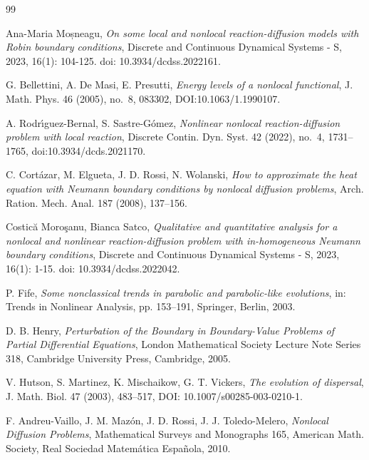 \documentclass[a4paper,12pt]{amsart}
\begin{document}
\begin{thebibliography}{99}

 {Ana-Maria Moșneagu, \emph{On some local and nonlocal reaction-diffusion models with Robin boundary conditions}, Discrete and Continuous Dynamical Systems - S, 2023, 16(1): 104-125. doi: 10.3934/dcdss.2022161.}

 G. {Bellettini}, A. De Masi, E. Presutti, \emph{Energy levels of a nonlocal functional}, {J. Math. Phys. 46 (2005), no.~8, 083302}, DOI:10.1063/1.1990107.

 A. {Rodr\'{\i}guez-Bernal}, S. {Sastre-G\'omez},  \emph{Nonlinear {nonlocal reaction-diffusion problem with local reaction}}, Discrete {Contin.} Dyn. Syst. {42} {(2022)}, no.~4, 1731--1765,
doi:10.3934/dcds.2021170.

 {C. Cort\'azar, M. Elgueta, J. D. Rossi, N. Wolanski, \emph{How to approximate the heat equation with Neumann boundary conditions by nonlocal diffusion problems}, Arch. Ration. Mech. Anal. 187 (2008), 137--156.}

 {Costică Moroşanu, Bianca Satco, \emph{Qualitative and quantitative analysis for a nonlocal and nonlinear reaction-diffusion problem with in-homogeneous Neumann boundary conditions}, Discrete and Continuous Dynamical Systems - S, 2023, 16(1): 1-15. doi: 10.3934/dcdss.2022042.}

  P. Fife, \emph{Some nonclassical trends in parabolic and parabolic-like evolutions}, {in: Trends in Nonlinear Analysis}, pp. 153--191, Springer, Berlin, 2003.

 D. B.  Henry, \emph{Perturbation of the {Boundary in Boundary-Value Problems} of Partial Differential Equations}, London Mathematical Society Lecture Note Series {318}, Cambridge University Press, {Cambridge, 2005}.

 V. Hutson, S. Martinez, K. Mischaikow, G. T. Vickers, \emph{The evolution of dispersal}, J. Math. Biol. 47 {(2003)}, 483--517, DOI: 10.1007/s00285-003-0210-1.

  {F. Andreu-Vaillo, J. M. Maz\'on, J. D. Rossi, J. J. Toledo-Melero}, \emph{Nonlocal Diffusion Problems}, {Mathematical Surveys and Monographs 165}, American Math. Society, Real Sociedad Matem\'atica {Espa\~nola}, 2010.

\end{thebibliography}
\end{document}
